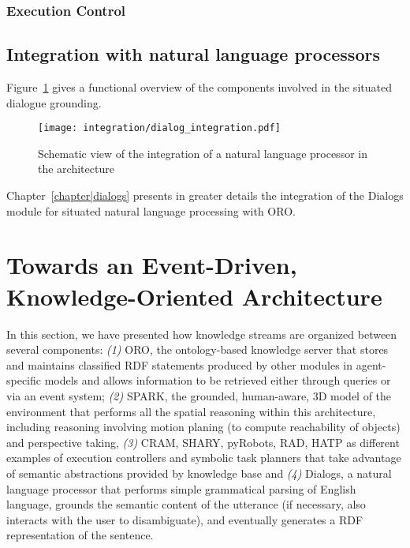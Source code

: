 \subsubsection{Execution Control}

\subsection{Integration with natural language processors}

Figure~\ref{fig|dialog-integration} gives a functional overview of the
components involved in the situated dialogue grounding.

\begin{figure}
    \centering
    \texttt{[image: integration/dialog\_integration.pdf]}
    \caption{Schematic view of the integration of a natural language processor
    in the architecture}
    \label{fig|dialog-integration}
\end{figure}

Chapter~\ref{chapter|dialogs} presents in greater details the integration of
the {\sc Dialogs} module for situated natural language processing with ORO.


\section{Towards an Event-Driven, Knowledge-Oriented Architecture}

In this section, we have presented how knowledge streams are organized between
several components: {\it(1)} {\sc ORO}, the ontology-based knowledge server
that stores and maintains classified RDF statements produced by other modules
in agent-specific models and allows information to be retrieved either through
queries or via an event system; {\it(2)} {\sc SPARK}, the grounded,
human-aware, 3D model of the environment that performs all the spatial
reasoning within this architecture, including reasoning involving motion
planing (to compute reachability of objects) and perspective taking, {\it(3)}
{\sc CRAM}, {\sc SHARY}, {\sc pyRobots}, {\sc RAD}, {\sc HATP} as different
examples of execution controllers and symbolic task planners that take
advantage of semantic abstractions provided by knowledge base and {\it(4)} {\sc
Dialogs}, a natural language processor that performs simple grammatical parsing
of English language, grounds the semantic content of the utterance (if
necessary, also interacts with the user to disambiguate), and eventually
generates a RDF representation of the sentence.

